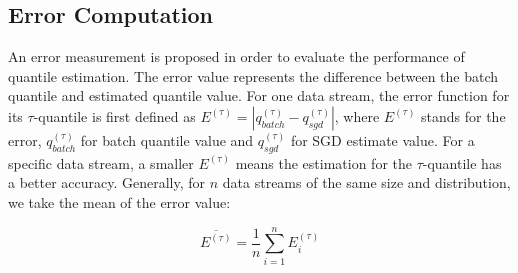 \subsection{Error Computation}

An error measurement is proposed in order to evaluate the performance of quantile estimation. The error value represents the difference between the batch quantile and estimated quantile value. For one data stream, the error function for its $\tau$-quantile is first defined as $E^{(\tau)} = | q_{batch}^{(\tau)} - q_{sgd}^{(\tau)} |$, where $E^{(\tau)}$ stands for the error, $q_{batch}^{(\tau)}$ for batch quantile value and $q_{sgd}^{(\tau)}$ for SGD estimate value. For a specific data stream, a smaller $E^{(\tau)}$ means the estimation for the $\tau$-quantile has a better accuracy. Generally, for $n$ data streams of the same size and distribution, we take the mean of the error value: 

    \begin{equation}
        \overline{E^{(\tau)}} = \frac{1}{n}\sum_{i=1}^{n} E^{(\tau)}_{i}
    \end{equation}
        
